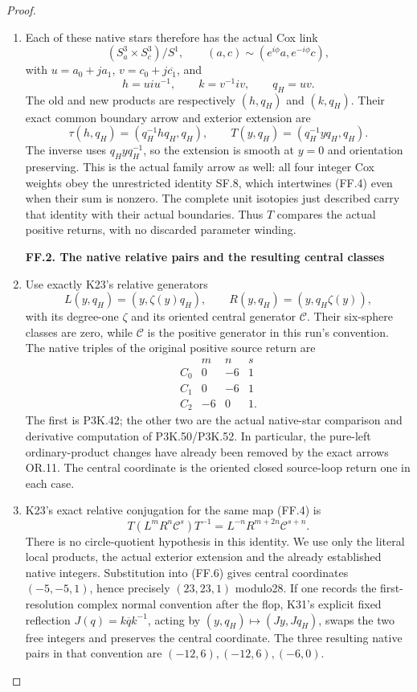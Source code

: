 \begin{proof}
\begin{enumerate}[label=\arabic*.]
\item Each of these native stars therefore has the actual Cox link
\[
 (S^3_a\times S^3_c)/S^1,\qquad
 (a,c)\sim(e^{i\phi}a,e^{-i\phi}c),
\]
with \(u=a_0+ja_1\), \(v=c_0+j\overline{c_1}\), and
\[
 h=uiu^{-1},\qquad k=v^{-1}iv,\qquad q_H=uv.
\]
The old and new products are respectively \((h,q_H)\) and
\((k,q_H)\). Their exact common boundary arrow and exterior
extension are
\[
 \tau(h,q_H)=(q_H^{-1}hq_H,q_H),\qquad
 T(y,q_H)=(q_H^{-1}yq_H,q_H).                         \tag{FF.4}
\]
The inverse uses \(q_Hyq_H^{-1}\), so the extension is smooth at
\(y=0\) and orientation preserving. This is the actual family arrow
as well: all four integer Cox weights obey the unrestricted
identity SF.8, which intertwines (FF.4) even when their sum is
nonzero. The complete unit isotopies just described carry that
identity with their actual boundaries. Thus \(T\) compares the
actual positive returns, with no discarded parameter winding.

\par

\medskip\noindent\textbf{FF.2. The native relative pairs and the resulting central classes}

\par\nobreak

\item Use exactly K23's relative generators
\[
 L(y,q_H)=(y,\zeta(y)q_H),\qquad
 R(y,q_H)=(y,q_H\zeta(y)),
\]
with its degree-one \(\zeta\) and its oriented central generator
\(\mathcal C\). Their six-sphere classes are zero, while
\(\mathcal C\) is the positive generator in this run's convention.
The native triples of the original positive source return are
\[
 \begin{array}{c|rrr}
 &m&n&s\\ \hline
 C_0&0&-6&1\\
 C_1&0&-6&1\\
 C_2&-6&0&1.
 \end{array}                                             \tag{FF.5}
\]
The first is P3K.42; the other two are the actual native-star
comparison and derivative computation of P3K.50/P3K.52. In
particular, the pure-left ordinary-product changes have already
been removed by the exact arrows OR.11. The central coordinate is
the oriented closed source-loop return one in each case.

\item K23's exact relative conjugation for the same map (FF.4) is
\[
 T(L^mR^n\mathcal C^s)T^{-1}
       =L^{-n}R^{m+2n}\mathcal C^{s+n}.              \tag{FF.6}
\]
There is no circle-quotient hypothesis in this identity. We use
only the literal local products, the actual exterior extension and
the already established native integers. Substitution into (FF.6)
gives central coordinates \((-5,-5,1)\), hence precisely
\((23,23,1)\) modulo28. If one records the first-resolution complex
normal convention after the flop, K31's explicit fixed reflection
\(J(q)=k\overline qk^{-1}\), acting by
\((y,q_H)\mapsto(Jy,Jq_H)\), swaps the two free integers and
preserves the central coordinate. The three resulting native pairs
in that convention are \((-12,6),(-12,6),(-6,0)\).


\end{enumerate}
\end{proof}
